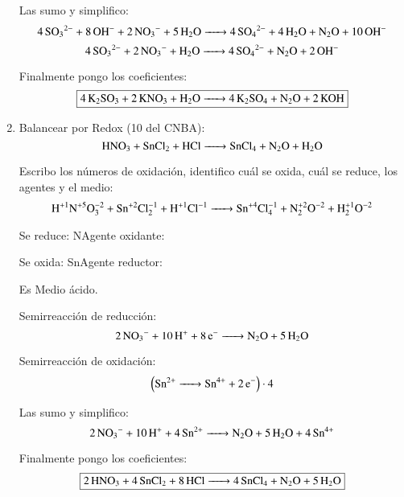 \begin{enumerate}
Las sumo y simplifico:
$$\ce{
4SO3^{2-} + 8OH^- + 2NO_3^- + 5H2O ->
4SO_4^{2-} + 4 H2O + N2O + 10OH^-
}$$
$$\ce{
4SO3^{2-} + 2NO_3^- + H2O ->
4SO_4^{2-} + N2O + 2OH^-
}$$

Finalmente pongo los coeficientes:
$$\fbox{\ce{4K2SO3 + 2KNO3 + H2O ->
4K2SO4 + N2O + 2KOH}}$$


\item
Balancear por Redox (10 del CNBA):
$$\ce{
HNO3 + SnCl2 + HCl ->
SnCl4 + N2O + H2O
}$$

Escribo los números de oxidación, identifico cuál se oxida, cuál se reduce, los agentes y el medio:
$$\ce{
H^{+1}N^{+5}O^{-2}3 + Sn^{+2}Cl^{-1}2 + H^{+1}Cl^{-1} ->
Sn^{+4}Cl^{-1}4 + N^{+2}2O^{-2} + H^{+1}2O^{-2}
}$$

\hfil Se reduce: N\hfil Agente oxidante: \hfil

\hfil Se oxida: Sn\hfil Agente reductor: \hfil

Es Medio ácido.

\begin{multicols}{2}
Semirreacción de reducción:
$$\ce{
2NO_3^- +10H^+ + 8e^- ->
N2O + 5H2O
}$$

Semirreacción de oxidación:
$$\left(\ce{
Sn^{2+} ->
Sn^{4+} + 2e^-
}\right)\cdot 4$$
\end{multicols}

Las sumo y simplifico:
$$\ce{
2NO_3^- + 10H^+ + 4Sn^{2+} ->
N2O + 5H2O + 4Sn^{4+}
}$$

Finalmente pongo los coeficientes:
$$\fbox{\ce{
2HNO3 + 4SnCl2 + 8HCl ->
4SnCl4 + N2O + 5H2O
}}$$

\end{enumerate}
